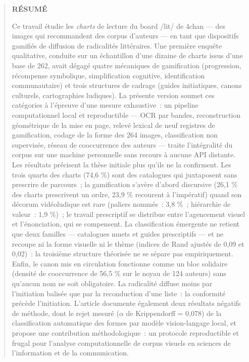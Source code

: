 \documentclass[11pt,a4paper]{article}
\begin{document}
\begin{quote}\small
{\sffamily\footnotesize\bfseries RÉSUMÉ}\par\smallskip
Ce travail étudie les \emph{charts} de lecture du board /lit/ de 4chan --- des images qui recommandent des corpus d'auteurs --- en tant que dispositifs gamifiés de diffusion de radicalités littéraires. Une première enquête qualitative, conduite sur un échantillon d'une dizaine de charts issus d'une base de 262, avait dégagé quatre mécaniques de gamification (progression, récompense symbolique, simplification cognitive, identification communautaire) et trois structures de cadrage (guides initiatiques, canons culturels, cartographies ludiques). La présente version soumet ces catégories à l'épreuve d'une mesure exhaustive~: un pipeline computationnel local et reproductible --- OCR par bandes, reconstruction géométrique de la mise en page, relevé lexical de neuf registres de gamification, codage de la forme des 264 images, classification non supervisée, réseau de cooccurrence des auteurs --- traite l'intégralité du corpus sur une machine personnelle sans recours à aucune API distante. Les résultats précisent la thèse initiale plus qu'ils ne la confirment. Les trois quarts des charts (74,6 \%) sont des catalogues qui juxtaposent sans prescrire de parcours~; la gamification s'avère d'abord discursive (26,1 \% des charts prescrivent un ordre, 23,9 \% recourent à l'impératif) quand son décorum vidéoludique est rare (paliers nommés~: 3,8 \%~; hiérarchie de valeur~: 1,9 \%)~; le travail prescriptif se distribue entre l'agencement visuel et l'énonciation, qui se compensent. La classification émergente ne retient que deux familles --- catalogues muets et guides prescriptifs --- et ne recoupe ni la forme visuelle ni le thème (indices de Rand ajustés de 0,09 et 0,02)~: la troisième structure théorisée ne se sépare pas empiriquement. Enfin, le canon mis en circulation fonctionne comme un bloc solidaire (densité de cooccurrence de 56,5 \% sur le noyau de 124 auteurs) sans qu'aucun nom ne soit obligatoire. La radicalité diffuse moins par l'initiation balisée que par la reconduction d'une liste~: la conformité précède l'initiation. L'article documente également deux résultats négatifs de méthode, dont le rejet mesuré ($\alpha$ de Krippendorff = 0,078) de la classification automatique des formes par modèle vision-langage local, et propose une contribution méthodologique~: un protocole reproductible et frugal pour l'analyse computationnelle de corpus visuels en sciences de l'information et de la communication.\par\smallskip

\end{quote}
\end{document}
